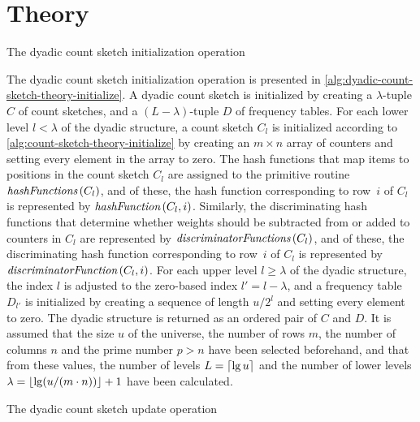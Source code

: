 \section{Theory}
\label{sec:dyadic-count-sketch-theory}

\begin{algorithm}
  \caption{The dyadic count sketch initialization operation}
  \label{alg:dyadic-count-sketch-theory-initialize}
  
\end{algorithm}

The dyadic count sketch initialization operation is presented in \cref{alg:dyadic-count-sketch-theory-initialize}.
A dyadic count sketch is initialized by creating a \( \lambda \)-tuple \( C \) of count sketches, and a \( (L - \lambda) \)-tuple \( D \) of frequency tables.
For each lower level \( l < \lambda \) of the dyadic structure, a count sketch \( C_{l} \) is initialized according to \cref{alg:count-sketch-theory-initialize} by creating an \( m \times n \) array of counters and setting every element in the array to zero.
The hash functions that map items to positions in the count sketch \( C_{l} \) are assigned to the primitive routine \( \hashFunctions (C_{l}) \), and of these, the hash function corresponding to row~\( i \) of \( C_{l} \) is represented by \( \hashFunction (C_{l}, i) \).
Similarly, the discriminating hash functions that determine whether weights should be subtracted from or added to counters in \( C_{l} \) are represented by \( \discriminatorFunctions (C_{l}) \), and of these, the discriminating hash function corresponding to row~\( i \) of \( C_{l} \) is represented by \( \discriminatorFunction (C_{l}, i) \).
For each upper level \( l \geq \lambda \) of the dyadic structure, the index \( l \) is adjusted to the zero-based index \( l' = l - \lambda \), and a frequency table \( D_{l'} \) is initialized by creating a sequence of length \( u / 2^{l} \) and setting every element to zero.
The dyadic structure is returned as an ordered pair of \( C \) and \( D \).
It is assumed that the size \( u \) of the universe, the number of rows \( m \), the number of columns \( n \) and the prime number \( p > n \) have been selected beforehand, and that from these values, the number of levels \( L = \lceil\lg u\rceil \) and the number of lower levels \( \lambda = \lfloor\lg (u / (m \cdot n))\rfloor + 1 \) have been calculated.

\begin{algorithm}
  \caption{The dyadic count sketch update operation}
  \label{alg:dyadic-count-sketch-theory-update}
  
\end{algorithm}

